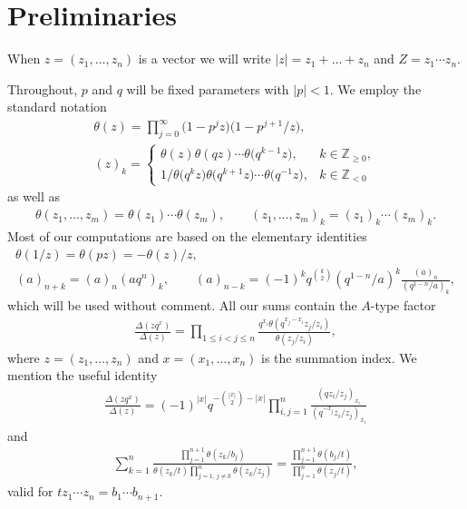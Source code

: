 \section{Preliminaries}

When $z=(z_1,\dots,z_n)$ is a vector we will write $|z|=z_1+\dots+z_n$ and $Z=z_1\dotsm z_n$.

Throughout, $p$ and $q$ will be f\/ixed parameters with $|p|<1$. We employ the standard notation
\begin{gather*}\theta(z)=\prod\limits_{j=0}^\infty\big(1-p^jz\big)\big(1-p^{j+1}/z\big), \\
(z)_k=\begin{cases}\theta(z)\theta(qz)\dotsm\theta\big(q^{k-1}z\big), & k\in\mathbb Z_{\geq 0},\\
1/\theta\big(q^kz\big)\theta\big(q^{k+1}z\big)\dotsm\theta\big(q^{-1}z\big), & k\in\mathbb Z_{<0}\end{cases} \end{gather*}
as well as
\begin{gather*}\theta(z_1,\dots,z_m)=\theta(z_1)\dotsm\theta(z_m), \qquad (z_1,\dots,z_m)_k=(z_1)_k\dotsm(z_m)_k.\end{gather*}
Most of our computations are based on the elementary identities
\begin{gather*}\theta(1/z)=\theta(pz)=-\theta(z)/z, \\
(a)_{n+k}=(a)_n(aq^n)_k,\qquad (a)_{n-k}=(-1)^kq^{\binom k2}(q^{1-n}/a)^k\frac{(a)_n}{(q^{1-n}/a)_k}, \end{gather*}
which will be used without comment. All our sums contain the $A$-type factor
\begin{gather*}\frac{\Delta(zq^x)}{\Delta(z)}=\prod\limits_{1\leq i<j\leq n}\frac{q^{x_i}\theta(q^{x_j-x_i}z_j/z_i)}{\theta(z_j/z_i)}, \end{gather*}
where $z=(z_1,\dots,z_n)$ and $x=(x_1,\dots,x_n)$ is the summation index. We mention the useful identity \cite[equation~(3.8)]{r}
\begin{gather}\label{etf}
\frac{\Delta(z q^x)}{\Delta(z)}=(-1)^{|x|}q^{-\binom{|x|}2-|x|}\prod\limits_{i,j=1}^n\frac{(qz_i/z_j)_{x_i}}{(q^{-x_j}z_i/z_j)_{x_i}}
\end{gather}
and \cite[Example~20.53.3]{ww}
\begin{gather}\label{tpf}
\sum_{k=1}^n\frac{\prod\limits_{j=1}^{n+1}\theta(z_k/b_j)}{\theta(z_k/t)\prod\limits_{j=1,\, j\neq k}^n\theta(z_k/z_j)}=\frac{\prod\limits_{j=1}^{n+1}\theta(b_j/t)}{\prod\limits_{j=1}^n\theta(z_j/t)},
\end{gather}
valid for $tz_1\dotsm z_n=b_1\dotsm b_{n+1}$.
